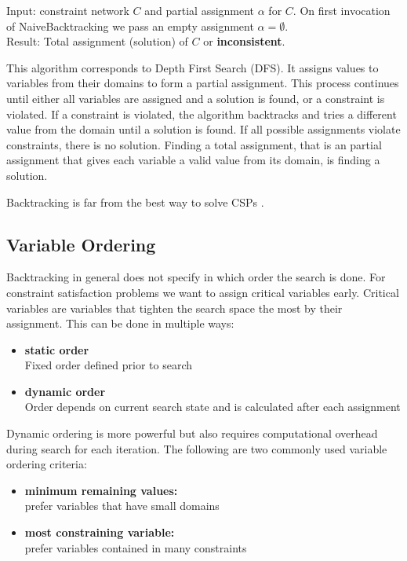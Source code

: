 Input: constraint network $C$ and partial assignment $\alpha$ for $C$. On first invocation of NaiveBacktracking we pass an empty assignment $\alpha = \emptyset$. \\
Result: Total assignment (solution) of $C$ or \textbf{inconsistent}.

This algorithm corresponds to Depth First Search (DFS). It assigns values to variables from their domains to form a partial assignment. This process continues until either all variables are assigned and a solution is found, or a constraint is violated. If a constraint is violated, the algorithm backtracks and tries a different value from the domain until a solution is found. If all possible assignments violate constraints, there is no solution. Finding a total assignment, that is an partial assignment that gives each variable a valid value from its domain, is finding a solution.

Backtracking is far from the best way to solve CSPs \cite{forward_checking:1995}.

\subsection{Variable Ordering}

Backtracking in general does not specify in which order the search is done. For constraint satisfaction problems we want to assign critical variables early. Critical variables are variables that tighten the search space the most by their assignment. This can be done in multiple ways:

\begin{itemize}
	\item \textbf{static order} \\
	      Fixed order defined prior to search
	\item \textbf{dynamic order} \\
	      Order depends on current search state and is calculated after each assignment
\end{itemize}

Dynamic ordering is more powerful but also requires computational overhead during search for each iteration. The following are two commonly used variable ordering criteria:

\begin{itemize}
	\item \textbf{minimum remaining values:} \\
	      prefer variables that have small domains
	\item \textbf{most constraining variable:} \\
	      prefer variables contained in many constraints
\end{itemize}

